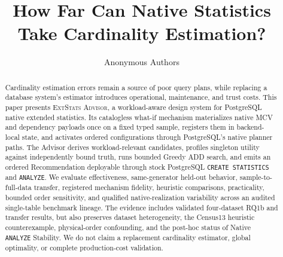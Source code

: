 \documentclass[sigconf,nonacm]{acmart}
\title{How Far Can Native Statistics Take Cardinality Estimation?}
\author{Anonymous Authors}
\affiliation{\institution{Under review}\city{Anonymous}\country{Anonymous}}
\newcommand{\advisor}{\textsc{ExtStats Advisor}\xspace}
\begin{document}
\begin{abstract}
Cardinality estimation errors remain a source of poor query plans, while replacing a database system's estimator introduces operational, maintenance, and trust costs. This paper presents \advisor, a workload-aware design system for PostgreSQL native extended statistics. Its catalogless what-if mechanism materializes native MCV and dependency payloads once on a fixed typed sample, registers them in backend-local state, and activates ordered configurations through PostgreSQL's native planner paths. The Advisor derives workload-relevant candidates, profiles singleton utility against independently bound truth, runs bounded Greedy ADD search, and emits an ordered Recommendation deployable through stock PostgreSQL \texttt{CREATE STATISTICS} and \texttt{ANALYZE}. We evaluate effectiveness, same-generator held-out behavior, sample-to-full-data transfer, registered mechanism fidelity, heuristic comparisons, practicality, bounded order sensitivity, and qualified native-realization variability across an audited single-table benchmark lineage. The evidence includes validated four-dataset RQ1b and transfer results, but also preserves dataset heterogeneity, the Census13 heuristic counterexample, physical-order confounding, and the post-hoc status of Native \texttt{ANALYZE} Stability. We do not claim a replacement cardinality estimator, global optimality, or complete production-cost validation.
\end{abstract}

\maketitle
\vldbtopmatter















\end{document}
